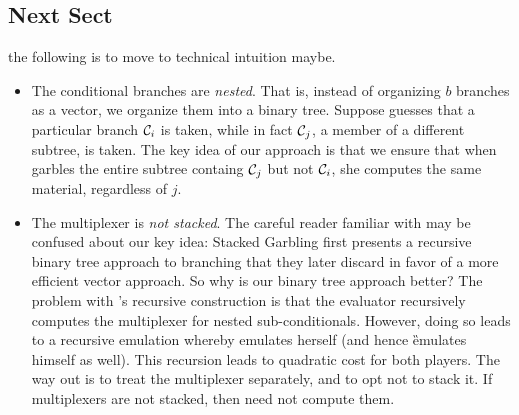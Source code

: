\medskip


\subsection{Next Sect}


the following is to move to technical intuition maybe.
\begin{itemize}

      \item The conditional branches are \emph{nested}.
    That is, instead of organizing $b$ branches as a vector, we
    organize them into a binary tree.
    Suppose \E guesses that a particular branch $\mathcal{C}_i$ is taken,
    while in fact $\mathcal{C}_j$, a member of a different subtree, is taken.
    The key idea of our approach is that we ensure that when \ev
    garbles the entire subtree containg $\mathcal{C}_j$ but not $\mathcal{C}_i$, she
    computes the same material, regardless of $j$.
  \item The multiplexer is \emph{not stacked}.
    The careful reader familiar with \cite{EPRINT:HeaKol20b} may be
    confused about our key idea: Stacked Garbling first presents a
    recursive binary tree approach to branching that they later
    discard in favor of a more efficient vector approach.
    So why is our binary tree approach better?
    The problem with \cite{EPRINT:HeaKol20b}'s recursive construction
    is that the evaluator recursively computes the multiplexer for
    nested sub-conditionals.
    However, doing so leads to a recursive emulation whereby \E
    emulates herself (and hence \G emulates himself as well).
    This recursion leads to quadratic cost for both players.
    The way out is to treat the multiplexer separately, and to opt not
    to stack it.
    If multiplexers are not stacked, then \E need not compute them.
\end{itemize}


